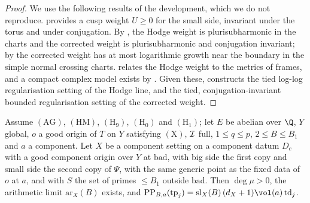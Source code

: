 \begin{proof}
We use the following results of the development, which we do not reproduce.
 provides a cusp weight $U\ge0$ for the small side, invariant
under the torus and under conjugation. By , the Hodge weight is
plurisubharmonic in the charts and the corrected weight is plurisubharmonic and conjugation invariant; by
 the corrected weight has at most logarithmic growth near the
boundary in the simple normal crossing charts. 
relates the Hodge weight to the metrics of frames, and a compact complex model exists by
. Given these,
 constructs the tied log-log regularisation setting of
the Hodge line, and  the tied, conjugation-invariant bounded
regularisation setting of the corrected weight.
\end{proof}

\begin{proposition}\label{pf:volthm:prop:slopeidentity}
Assume $(\mathrm{AG})$, $(\mathrm{HM})$, $(\mathrm{H}_9)$, $(\mathrm{H}_0)$ and $(\mathrm{H}_1)$; let $E$ be abelian over
$\Q$, $Y$ global, $o$ a good origin of $T$ on $Y$ satisfying $(\mathrm{X})$, $\mathcal{I}$ full, $1\le q\le p$, $2\le B\le
B_1$ and $a$ a component. Let $X$ be a component setting on a component datum $D_c$ with a good component origin over
$Y$ at $\mathrm{bad}$, with big side the first copy and small side the second copy of $\Psi$, with the same generic
point as the fixed data of $o$ at $a$, and with $S$ the set of primes $\le B_1$ outside $\mathrm{bad}$. Then
$\deg\mu>0$, the arithmetic limit $\mathrm{ar}_X(B)$ exists, and
$\volthmPP_{B,a}(\mathrm{tp}_j)=\mathrm{sl}_X(B)\,(d_X+1)\vol(a)\,\mathrm{td}_j$.
\end{proposition}

